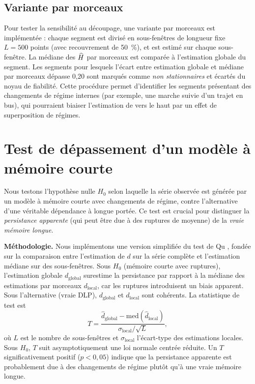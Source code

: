 \subsection{Variante par morceaux}
\label{sec:variante_morceaux}
Pour tester la sensibilité au découpage, une variante par morceaux est implémentée : chaque segment est divisé en sous-fenêtres de longueur fixe $L = 500$ points (avec recouvrement de 50~\%), et \Hurst{} est estimé sur chaque sous-fenêtre. La médiane des $\widehat{H}$ par morceaux est comparée à l'estimation globale du segment. Les segments pour lesquels l'écart entre estimation globale et médiane par morceaux dépasse 0{,}20 sont marqués comme \emph{non stationnaires} et écartés du noyau de fiabilité. Cette procédure permet d'identifier les segments présentant des changements de régime internes (par exemple, une marche suivie d'un trajet en bus), qui pourraient biaiser l'estimation de \Hurst{} vers le haut par un effet de superposition de régimes.

\section{Test de dépassement d'un modèle à mémoire courte}
\label{sec:test_depassement}
Nous testons l'hypothèse nulle $H_0$ selon laquelle la série observée est générée par un modèle à mémoire courte avec changements de régime, contre l'alternative d'une véritable dépendance à longue portée. Ce test est crucial pour distinguer la \emph{persistance apparente} (qui peut être due à des ruptures de moyenne) de la \emph{vraie mémoire longue}.

\medskip
\textbf{Méthodologie.} Nous implémentons une version simplifiée du test de Qu \cite{qu2011}, fondée sur la comparaison entre l'estimation de $d$ sur la série complète et l'estimation médiane sur des sous-fenêtres. Sous $H_0$ (mémoire courte avec ruptures), l'estimation globale $d_{\text{global}}$ surestime la persistance par rapport à la médiane des estimations par morceaux $d_{\text{local}}$, car les ruptures introduisent un biais apparent. Sous l'alternative (vraie DLP), $d_{\text{global}}$ et $d_{\text{local}}$ sont cohérents. La statistique de test est
\begin{equation}
T = \frac{\hat{d}_{\text{global}} - \text{med}(\hat{d}_{\text{local}})}{\sigma_{\text{local}} / \sqrt{L}},
\end{equation}
où $L$ est le nombre de sous-fenêtres et $\sigma_{\text{local}}$ l'écart-type des estimations locales. Sous $H_0$, $T$ suit asymptotiquement une loi normale centrée réduite. Un $T$ significativement positif ($p < 0{,}05$) indique que la persistance apparente est probablement due à des changements de régime plutôt qu'à une vraie mémoire longue.

